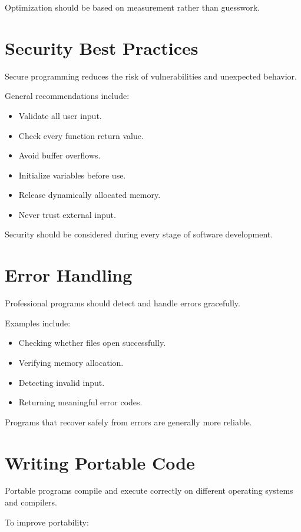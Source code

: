 \documentclass[12pt,openany]{book}
\begin{document}
Optimization should be based on measurement rather than guesswork.
\section{Security Best Practices}

Secure programming reduces the risk of vulnerabilities and unexpected behavior.

General recommendations include:

\begin{itemize}
    \item Validate all user input.
    \item Check every function return value.
    \item Avoid buffer overflows.
    \item Initialize variables before use.
    \item Release dynamically allocated memory.
    \item Never trust external input.
\end{itemize}

Security should be considered during every stage of software development.

\section{Error Handling}

Professional programs should detect and handle errors gracefully.

Examples include:

\begin{itemize}
    \item Checking whether files open successfully.
    \item Verifying memory allocation.
    \item Detecting invalid input.
    \item Returning meaningful error codes.
\end{itemize}

Programs that recover safely from errors are generally more reliable.

\section{Writing Portable Code}

Portable programs compile and execute correctly on different operating systems and compilers.

To improve portability:
\end{document}
